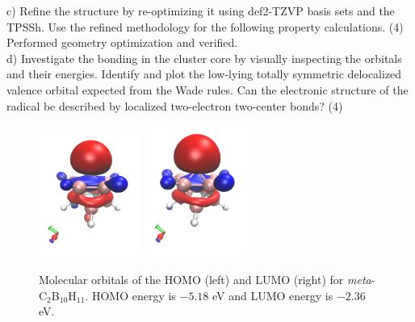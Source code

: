 \documentclass{article}
\begin{document}
\noindent c) Refine the structure by re-optimizing it using def2-TZVP basis
sets and the TPSSh. Use the refined methodology for the following property
calculations. (4)
\\

{\color{blue} Performed geometry optimization and verified.}
\\

\noindent d) Investigate the bonding in the cluster core by visually inspecting
the orbitals and their energies. Identify and plot the low-lying totally symmetric
delocalized valence orbital expected from the Wade rules. Can the electronic
structure of the radical be described by localized two-electron two-center
bonds? (4)

\begin{figure}[H]
  \centering
  \includegraphics[width=0.3\textwidth]{homo_37a_a.png}
  \includegraphics[width=0.3\textwidth]{lumo_37a_b.png}
  \caption{Molecular orbitals of the HOMO (left) and LUMO (right) for
    \textit{meta}-C$_2$B$_{10}$H$_{11}$. HOMO energy is $-5.18$ eV and
    LUMO energy is $-2.36$ eV.}
  \label{fig:orbital}
\end{figure}
\end{document}
